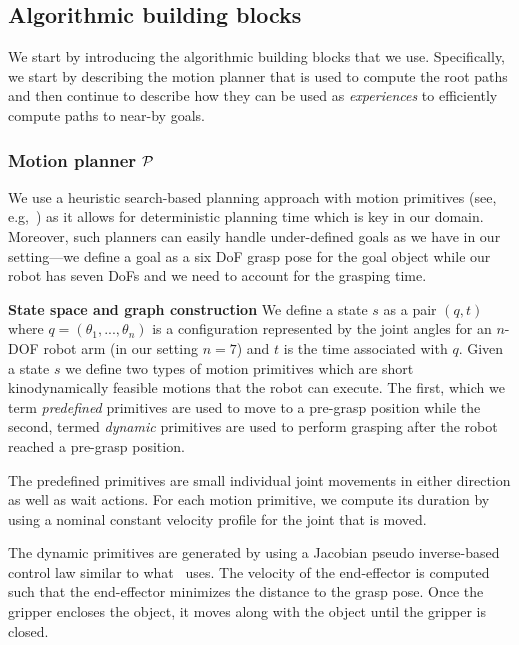 \documentclass[a4paper]{report}
\begin{document}
\subsection{Algorithmic building blocks}
We start by introducing the algorithmic building blocks that we use.
Specifically, we start by describing the motion planner that is used to compute the root paths 
and then continue to describe how they can be used as \emph{experiences} to efficiently compute paths to near-by goals.

\subsubsection{Motion planner $\mathcal{P}$}
We use a heuristic search-based planning approach with motion primitives (see, e.g,~\cite{CCL10,CSCL11,LF09})
as it allows for deterministic planning time which is key in our domain.
Moreover, such planners can easily handle under-defined goals as we have in our setting---we define a goal as a six DoF grasp pose for the goal object while our robot has seven DoFs and we need to account for the grasping time.

\textbf{State space and graph construction}
We define a state $s$ as a pair $(q,t)$ where $q = (\theta_1, ..., \theta_n)$ is a configuration represented by the joint angles for an $n$-DOF robot arm (in our setting $n=7$) and $t$ is the time associated with $q$.
%
Given a state $s$ we define two types of motion primitives which are short kinodynamically feasible motions that the robot can execute. The first, which we term \emph{predefined} primitives are used to move to a pre-grasp position while the second, termed \emph{dynamic} primitives are used to perform grasping after the robot reached a pre-grasp position.
%

The predefined primitives are small individual joint movements in either direction as well as wait actions.
For each motion primitive, we compute its duration by using a nominal constant velocity profile for the  joint that is moved.
%

The dynamic primitives are generated by using a Jacobian pseudo inverse-based control law similar to what~\cite{menon2014motion} uses. 
The velocity of the end-effector is computed such that the end-effector minimizes the distance to the grasp pose. Once the gripper encloses the object, it moves along with the object until the gripper is closed.
\end{document}

